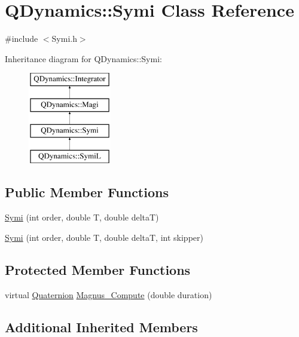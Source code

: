 \hypertarget{classQDynamics_1_1Symi}{}\section{Q\+Dynamics\+:\+:Symi Class Reference}
\label{classQDynamics_1_1Symi}


{\ttfamily \#include $<$Symi.\+h$>$}

Inheritance diagram for Q\+Dynamics\+:\+:Symi\+:\begin{figure}[H]
\begin{center}
\leavevmode
\includegraphics[height=4.000000cm]{classQDynamics_1_1Symi}
\end{center}
\end{figure}
\subsection*{Public Member Functions}
\begin{DoxyCompactItemize}
\item 
\hyperlink{classQDynamics_1_1Symi_afc73292268197d37fad6716aa6bb5976}{Symi} (int order, double T, double deltaT)
\item 
\hyperlink{classQDynamics_1_1Symi_a2e248bf5141814ca1e8285227d26d4bc}{Symi} (int order, double T, double deltaT, int skipper)
\end{DoxyCompactItemize}
\subsection*{Protected Member Functions}
\begin{DoxyCompactItemize}
\item 
virtual \hyperlink{classQDynamics_1_1Quaternion}{Quaternion} \hyperlink{classQDynamics_1_1Symi_a4cea691ad899227f92004dd666180415}{Magnus\+\_\+\+Compute} (double duration)
\end{DoxyCompactItemize}
\subsection*{Additional Inherited Members}



